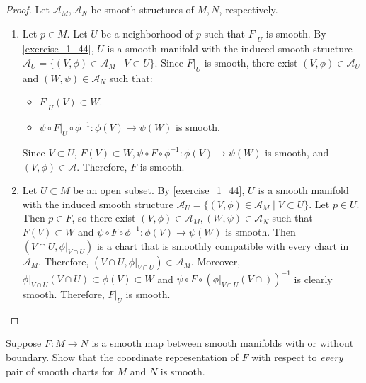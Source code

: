 \begin{proof}
  Let $\mathcal{A}_M, \mathcal{A}_N$ be smooth structures of $M, N$, respectively.
  \begin{enumerate}[label=(\alph*)]
    \item 
      Let $p \in M$.
      Let $U$ be a neighborhood of $p$ such that $F\vert_U$ is smooth.
      By \ref{exercise_1_44}, $U$ is a smooth manifold with the induced smooth structure $\mathcal{A}_U = \{ (V, \phi) \in \mathcal{A}_M \mid V \subset U \}$.
      Since $F\vert_U$ is smooth, there exist $(V, \phi) \in \mathcal{A}_U$ and $(W, \psi) \in \mathcal{A}_N$ such that:
      \begin{itemize}
        \item
          $F\vert_U(V) \subset W$.
        \item
          $\psi \circ F\vert_U \circ \phi^{-1}:\phi(V) \rightarrow \psi(W)$ is smooth.
      \end{itemize}
      Since $V \subset U$, $F(V) \subset W, \psi \circ F \circ \phi^{-1}:\phi(V) \rightarrow \psi(W)$ is smooth, and $(V, \phi) \in \mathcal{A}$.
      Therefore, $F$ is smooth.
    \item
      Let $U \subset M$ be an open subset.
      By \ref{exercise_1_44}, $U$ is a smooth manifold with the induced smooth structure $\mathcal{A}_U = \{ (V, \phi) \in \mathcal{A}_M \mid V \subset U \}$.
      Let $p \in U$.
      Then $p \in F$, so there exist $(V, \phi) \in \mathcal{A}_M, (W, \psi) \in \mathcal{A}_N$ such that $F(V) \subset W$ and $\psi \circ F \circ \phi^{-1}: \phi(V) \rightarrow \psi(W)$ is smooth.
      Then $(V \cap U, \phi\vert_{V \cap U})$ is a chart that is smoothly compatible with every chart in $\mathcal{A}_M$.
      Therefore, $(V \cap U, \phi\vert_{V \cap U}) \in \mathcal{A}_M$.
      Moreover, $\phi\vert_{V \cap U}(V \cap U) \subset \phi(V) \subset W$ and $\psi \circ F \circ (\phi\vert_{V \cap U}(V \cap ))^{-1}$ is clearly smooth.
      Therefore, $F \vert_U$ is smooth.
  \end{enumerate}
\end{proof}

\begin{customexer}{2.9}
  Suppose $F: M \rightarrow N$ is a smooth map between smooth manifolds with or without boundary.
  Show that the coordinate representation of $F$ with respect to \textit{every} pair of smooth charts for $M$ and $N$ is smooth.
\end{customexer}

